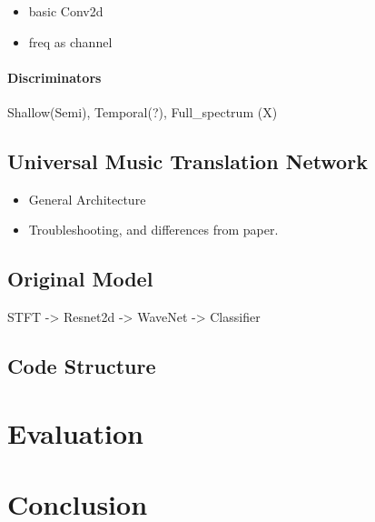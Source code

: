 \documentclass[]{article}
\providecommand{\tightlist}{%
  \setlength{\itemsep}{0pt}\setlength{\parskip}{0pt}}
\begin{document}
\begin{itemize}
\tightlist
\item
  basic Conv2d
\item
  freq as channel
\end{itemize}

\paragraph{Discriminators}

Shallow(Semi), Temporal(?), Full\_spectrum (X)

\hypertarget{universal-music-translation-network-1}{%
\subsection{Universal Music Translation
Network}\label{universal-music-translation-network-1}}

\begin{itemize}
\item
  General Architecture
\item
  Troubleshooting, and differences from paper.
\end{itemize}

\hypertarget{original-model}{%
\subsection{Original Model}\label{original-model}}

STFT -\textgreater{} Resnet2d -\textgreater{} WaveNet -\textgreater{}
Classifier

\hypertarget{code-structure}{%
\subsection{Code Structure}\label{code-structure}}

\hypertarget{evaluation}{%
\section{Evaluation}\label{evaluation}}

\hypertarget{conclusion}{%
\section{Conclusion}\label{conclusion}}
\end{document}
